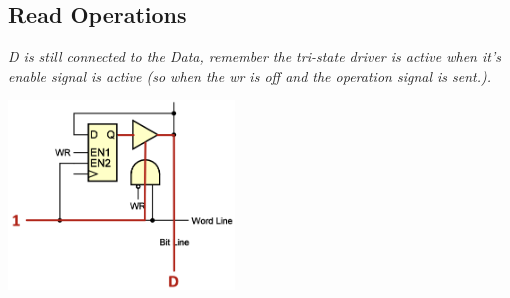 \subsection{Read Operations}
\textit{D is still connected to the Data, remember the tri-state driver is active when it's enable signal is active (so when the wr is off and the operation signal is sent.).} \\ \vspace*{5px}
\begin{center}
    \includegraphics[width=0.45\textwidth]{chapters/chapter1c/images/read.png}
\end{center}


